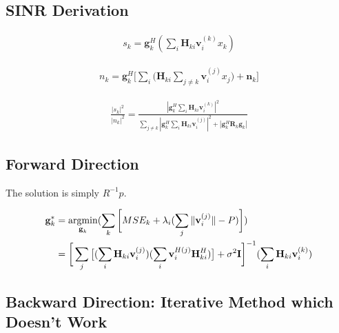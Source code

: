 \documentclass[11pt, oneside]{article}   	%
\begin{document}
\subsection{SINR Derivation}
\begin{align*}
s_{k} = \textbf{g}^{H}_{k}
		(\displaystyle\sum_{i}
		\textbf{H}_{ki} 
		\textbf{v}^{(k)}_{i}x_k)
\end{align*}



\begin{align*}
n_{k} = \textbf{g}^{H}_{k}
		\bigg[\displaystyle\sum_{i}
		\big(	\textbf{H}_{ki} 
		\displaystyle\sum_{j \neq k}	\textbf{v}^{(j)}_{i}x_j	\big)
		+\textbf{n}_{k}\bigg]
\end{align*}

\begin{align*}
\frac	{	|s_{k}|^2	}{	|n_{k}|^2	} = 
\frac {	|\textbf{g}^{H}_{k}
		\displaystyle\sum_{i}
		\textbf{H}_{ki} 
		\textbf{v}^{(k)}_{i}|^2	
	} 
	{	\displaystyle\sum_{j \neq k}
		|\textbf{g}^{H}_{k}
		\displaystyle\sum_{i}
		\textbf{H}_{ki} 
		\textbf{v}^{(j)}_{i}|^2
		+|\textbf{g}^{H}_{k}
		\textbf{R}_{k}
		\textbf{g}_{k}|
	}
\end{align*}

\subsection{Forward Direction}
The solution is simply $R^{-1}p$.


\begin{align*}
\textbf{g}^*_{k} 	&= \operatornamewithlimits{argmin}_{\textbf{g}_{k}}	(\displaystyle\sum_{k} 	\bigg[	MSE_{k}	+	\lambda_{i}	(\displaystyle\sum_{j}	\|	\textbf{v}^{(j)}_{i}	\|	-P	)	\bigg])	\\
			&= \bigg[	\displaystyle\sum_{j}
				\big[	(\displaystyle\sum_{i}\textbf{H}_{ki}\textbf{v}^{(j)}_{i})
			      (\displaystyle\sum_{i}\textbf{v}^{H(j)}_{i}\textbf{H}^{H}_{ki})	\big]	 +\sigma^2	\textbf{I}
			      \bigg]^{-1}	(\displaystyle\sum_{i}	\textbf{H}_{ki}	\textbf{v}^{(k)}_{i})		      
\end{align*}


\subsection{Backward Direction: Iterative Method which Doesn't Work}
\end{document}
